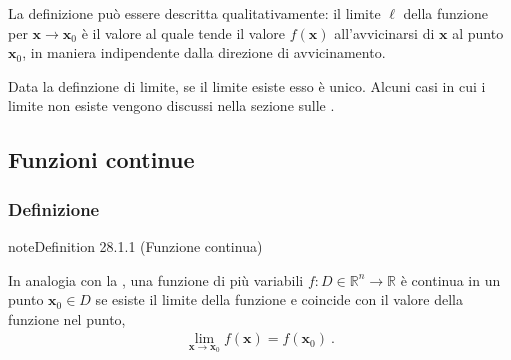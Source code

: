 \documentclass[letterpaper,10pt,italian]{jupyterBook}
\begin{document}
\sphinxAtStartPar
La definizione può essere descritta qualitativamente: il limite \(\ell\) della funzione per \(\mathbf{x} \rightarrow \mathbf{x}_0\) è il valore al quale tende il valore \(f(\mathbf{x})\) all’avvicinarsi di \(\mathbf{x}\) al punto \(\mathbf{x}_0\), in maniera indipendente dalla direzione di avvicinamento.

\sphinxAtStartPar
Data la definzione di limite, se il limite esiste esso è unico. Alcuni casi in cui i limite non esiste vengono discussi nella sezione sulle {\hyperref[\detokenize{ch/multivariable-calculus/limits:multivariable-calculus-discontinuity}]{}}.


\subsection{Funzioni continue}
\label{\detokenize{ch/multivariable-calculus/limits:funzioni-continue}}\label{\detokenize{ch/multivariable-calculus/limits:multivariable-calculus-continuity}}

\subsubsection{Definizione}
\label{\detokenize{ch/multivariable-calculus/limits:definizione}}\label{\detokenize{ch/multivariable-calculus/limits:multivariable-calculus-continuity-def}}\label{ch/multivariable-calculus/limits:definition-0}
\begin{sphinxadmonition}{note}{Definition 28.1.1 (Funzione continua)}



\sphinxAtStartPar
In analogia con la {\hyperref[\detokenize{ch/infinitesimal_calculus/analysis:infinitesimal-calculus-limits-def}]{}}, una funzione di più variabili \(f: D \in \mathbb{R}^n \rightarrow \mathbb{R}\) è continua in un punto \(\mathbf{x}_0 \in D\) se esiste il limite della funzione e coincide con il valore della funzione nel punto,
\begin{equation*}
\begin{split}\lim_{\mathbf{x} \rightarrow \mathbf{x}_0} f(\mathbf{x}) = f(\mathbf{x}_0) \ .\end{split}
\end{equation*}\end{sphinxadmonition}
\end{document}
